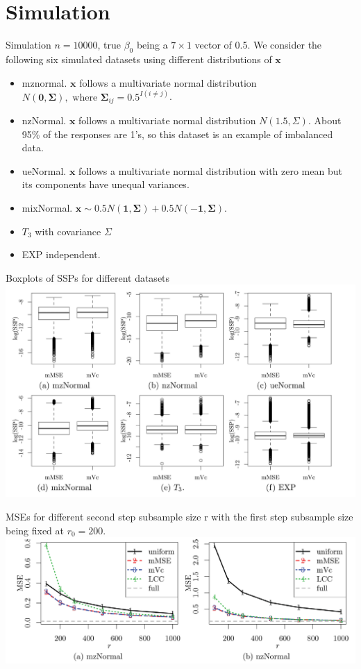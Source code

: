 \documentclass[12pt]{beamer}
\begin{document}
\section{Simulation}
\begin{frame}{Simulation}
$n=10000$, true $\beta_0$ being a $7 \times 1$ vector of 0.5.
We consider the following six simulated datasets using different distributions of $\mathbf{x}$
\begin{itemize}
\item mznormal. $\mathbf{x}$ follows a multivariate normal distribution $N(\mathbf{0}, \mathbf{\Sigma}), \text { where } \boldsymbol{\Sigma}_{i j}=0.5^{I(i \neq j)}$.
\item nzNormal.  $\mathbf{x}$ follows a multivariate normal distribution $N(1.5,\Sigma)$. About 95\% of the
responses are 1’s, so this dataset is an example of imbalanced
data.
\item ueNormal. $\mathbf{x}$ follows a multivariate normal distribution with zero mean but its components have unequal variances.
\item mixNormal. $\mathbf{x} \sim 0.5 N(\mathbf{1}, \mathbf{\Sigma})+0.5 N(-\mathbf{1}, \mathbf{\Sigma})$.
\item $T_3$ with covariance $\Sigma$
\item EXP independent.

\end{itemize}
\end{frame}


\begin{frame}{Boxplots of SSPs for different datasets}
\includegraphics[scale=0.8]{fig2.png} 
\end{frame}

\begin{frame}{MSEs for different second step subsample size r with the first step subsample size being fixed at $r_0=200$.}
\includegraphics[scale=0.8]{fig3.png} 
\end{frame}
\end{document}
